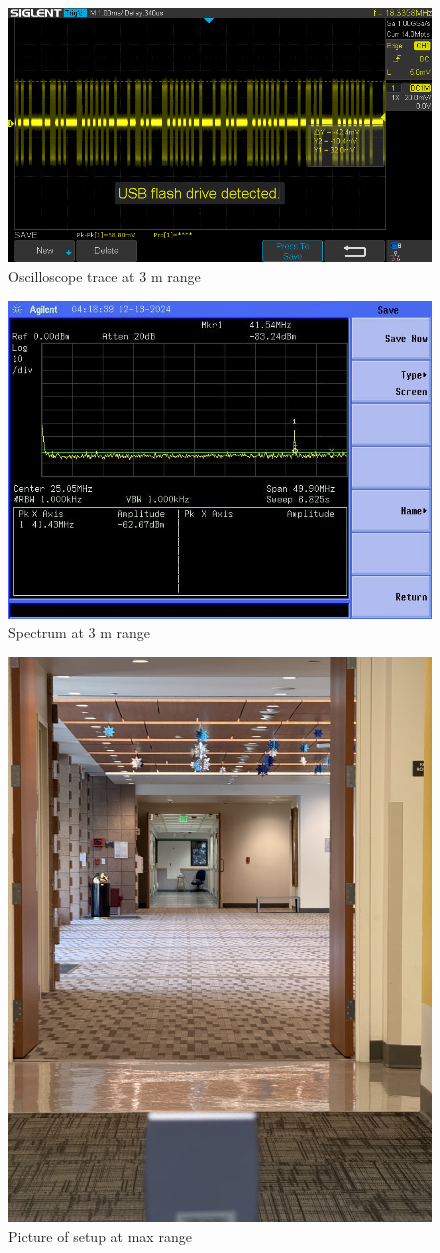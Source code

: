 \documentclass[letterpaper,12pt]{article}
\begin{document}
\begin{figure}[H]
	\begin{centering}
		\includegraphics[width=0.8\columnwidth]{figures/3m.trace}
		\caption{Oscilloscope trace at 3 m range}
	\end{centering}
\end{figure}

\begin{figure}[H]
	\begin{centering}
		\includegraphics[width=0.5\columnwidth]{figures/3m.spectra}
		\caption{Spectrum at 3 m range}
	\end{centering}
\end{figure}

\begin{figure}[H]
	\begin{centering}
		\includegraphics[width=0.5\columnwidth,angle=-90]{figures/maxm.img}
		\caption{Picture of setup at max range}
	\end{centering}
\end{figure}
\end{document}
